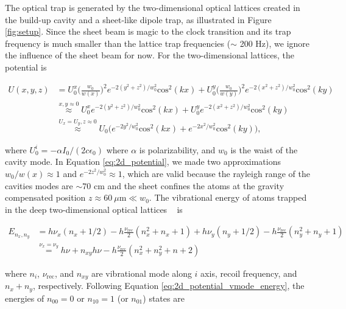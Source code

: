 \documentclass[bibnotes]{article}
\begin{document}
	The optical trap is generated by the two-dimensional optical lattices created in the build-up cavity and a sheet-like dipole trap, as illustrated in Figure \ref{fig:setup}. Since the sheet beam is magic to the clock transition and its trap frequency is much smaller than the lattice trap frequencies ($\sim$ 200 Hz), we ignore the influence of the sheet beam for now. For the two-dimensional lattices, the potential is

	\begin{align}
	U(x,y,z)&=U^{x}_{0}\bigg(\frac{w_{0}}{w(x)}\bigg)^{2}e^{-2(y^{2}+z^{2})/w^{2}_{0}}\text{cos}^{2}(kx)+U^{y}_{0}\bigg(\frac{w_{0}}{w(y)}\bigg)^{2}e^{-2(x^{2}+z^{2})/w^{2}_{0}}\text{cos}^{2}(ky) \nonumber \\
	&\stackrel{x,y \approx 0}{\approx} U^{x}_{0}e^{-2(y^{2}+z^{2})/w^{2}_{0}}\text{cos}^{2}(kx)+U^{y}_{0}e^{-2(x^{2}+z^{2})/w^{2}_{0}}\text{cos}^{2}(ky) \nonumber\\
	&\stackrel{U_{x}=U_{y}, z\approx{0}}{\approx} U_{0}\bigg(e^{-2y^{2}/w^{2}_{0}}\text{cos}^{2}(kx)+e^{-2x^{2}/w^{2}_{0}}\text{cos}^{2}(ky)\bigg),
	\label{eq:2d_potential}
	\end{align}

	\noindent where $U^{i}_{0} = - \alpha I_{0} / (2c\epsilon_{0})$ where $\alpha$ is polarizability, and $w_{0}$ is the waist of the cavity mode. In Equation \ref{eq:2d_potential}, we made two approximations $w_{0}/w(x)\approx1$ and $e^{-2z^{2}/w^{2}_{0}}\approx 1$, which are valid because the rayleigh range of the cavities modes are $\sim 70$ cm and the sheet confines the atoms at the gravity compensated position $z\approx 60 \ \mu \text{m} \ll  w_{0}$. The vibrational energy of atoms trapped in the deep two-dimensional optical lattices ~\cite{blatt09} is
	
	\begin{align}\label{eq:2d_potential_vmode_energy}
	E_{n_x,n_y}&=h\nu_{x}(n_{x}+1/2)-h\frac{\nu_{\text{rec}}}{2}(n^{2}_{x}+n_{x}+1)
	+h\nu_{y}(n_{y}+1/2)-h\frac{\nu_{\text{rec}}}{2}(n^{2}_{y}+n_{y}+1) \nonumber\\
	&\stackrel{\nu_x=\nu_y}=h\nu + n_{xy}h\nu - h\frac{\nu_{\text{rec}}}{2}(n^{2}_x+n^{2}_y+n+2)
	\end{align}

	\noindent where $n_{i}$, $\nu_{\text{rec}}$, and $n_{xy}$ are vibrational mode along $i$ axis, recoil frequency, and $n_x+n_y$, respectively. Following Equation \ref{eq:2d_potential_vmode_energy}, the energies of $n_{00}=0$ or $n_{10}=1$ (or $n_{01}$) states are
\end{document}
